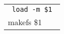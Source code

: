 {\tt
  \begin{tabular}{|l|}
    \hline \tt
    load -m \$1 \\
    makefs \$1  \\
    \hline
  \end{tabular}
}

